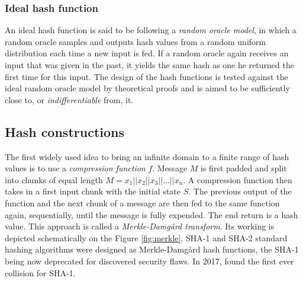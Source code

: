 \subsubsection{Ideal hash function}
An ideal hash function is said to be following a \textit{random oracle model}, in which a random oracle samples and outputs hash values from a random uniform distribution each time a new input is fed. If a random oracle again receives an input that was given in the past, it yields the same hash as one he returned the first time for this input. The design of the hash functions is tested against the ideal random oracle model by theoretical proofs and is aimed to be sufficiently close to, or \textit{indifferentiable} from, it.

\subsection{Hash constructions}
The first widely used idea to bring an infinite domain to a finite range of hash values is to use a \textit{compression function} $f$. Message $M$ is first padded and split into chunks of equal length $M=x_1||x_2||x_3||\ldots||x_n$. A compression function then takes in a first input chunk with the initial state $S$. The previous output of the function and the next chunk of a message are then fed to the same function again, sequentially, until the message is fully expended. The end return is a hash value. This approach is called a \textit{Merkle-Damgård transform}. Its working is depicted schematically on the Figure \ref{fig:merkle}. SHA-1 and SHA-2 standard hashing algorithms were designed as Merkle-Damgård hash functions, the SHA-1 being now deprecated for discovered security flaws. In 2017, \cite{firstcollision} found the first ever collision for SHA-1.


